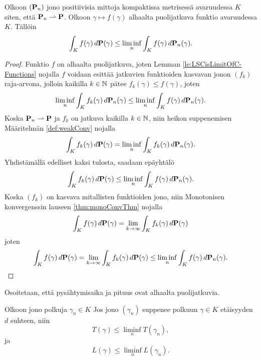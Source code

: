 \documentclass[12pt,oneside,a4paper]{amsbook} %
\begin{document}
\begin{lemma}\label{le:fdPLeLiminf}
    Olkoon $(\P_n)$ jono positiivisia mittoja kompaktissa metrisessä avaruudessa $K$ siten, että $\P_n \rightharpoonup \P$. Olkoon $\gamma \mapsto f(\gamma)$ alhaalta puolijatkuva funktio avaruudessa $K$. Tällöin
    \begin{equation*}
        \int_K f(\gamma) \, d\P(\gamma) \le \liminf_n \int_K f(\gamma) \, d\P_n(\gamma).
    \end{equation*}
\end{lemma}
\begin{proof}
    Funktio $f$ on alhaalta puolijatkuva, joten Lemman \ref{le:LSCisLimitOfC-Functions} nojalla $f$ voidaan esittää jatkuvien funktioiden kasvavan jonon $(f_k)$ raja-arvona, jolloin kaikilla $k \in \N$ pätee $f_k(\gamma) \le f(\gamma)$, joten
    \begin{equation*}
        \liminf_n \int_K f_k(\gamma) \, d\P_n(\gamma) \le \liminf_n \int_K f(\gamma)\, d\P_n(\gamma).
    \end{equation*}
    Koska $\P_n \rightharpoonup \P$ ja $f_k$ on jatkuva kaikilla $k \in \N$, niin heikon suppenemisen Määritelmän \ref{def:weakConv} nojalla
    \begin{equation*}
        \int_K f_k(\gamma) \, d\P(\gamma) = \liminf_{n} \int_K f_k(\gamma)\, d\P_n(\gamma).
    \end{equation*}
    Yhdistämällä edelliset kaksi tulosta, saadaan epäyhtälö
    \begin{equation*}\label{eq:mainThmMonoConv}
        \int_K f_k(\gamma) \, d\P(\gamma) \le \liminf_n \int_K f(\gamma) \, d\P_n(\gamma).
    \end{equation*}
    Koska $(f_k)$ on kasvava mitallisten funktioiden jono, niin Monotonisen konvergenssin lauseen \ref{thm:monoConvThm} nojalla 
    \begin{equation*}
        \int_K f(\gamma) \, d\P(\gamma) = \lim_{k\to \infty}\int_K f_k(\gamma)\, d\P(\gamma) 
    \end{equation*}
    joten
    \begin{equation*}
        \int_K f(\gamma) \, d\P(\gamma) = \lim_{k\to \infty}\int_K f_k(\gamma)\, d\P(\gamma)  \le \liminf_n \int_K f(\gamma) \, d\P_n(\gamma).
    \end{equation*}
\end{proof}
Osoitetaan, että pysähtymisaika ja pituus ovat alhaalta puolijatkuvia.
\begin{lemma}\label{le:pysahtymisajan&pituudenLSC}
    Olkoon jono polkuja $\gamma_n \in K$ Jos jono $(\gamma_n)$ suppenee polkuun $\gamma \in K$ etäisyyden $d$ suhteen, niin
    \begin{equation*}
        T(\gamma) \le \liminf_n T(\gamma_n),
    \end{equation*}
    ja 
    \begin{equation*}
        L(\gamma) \le \liminf_n L(\gamma_n).
    \end{equation*}
\end{lemma}
\end{document}
